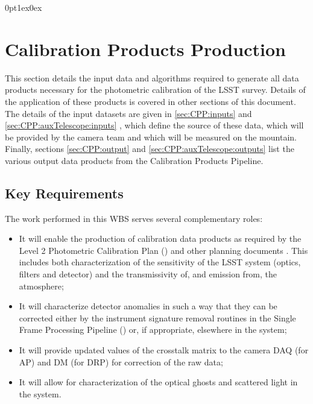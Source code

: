 \titlespacing*{\subsubsection}
{0pt}{1ex}{0ex}


\section{Calibration Products Production}
\label{sec:cpp}

This section details the input data and algorithms required to generate all data products necessary for the photometric calibration of the LSST survey. Details of the application of these products is covered in other sections of this document. The details of the input datasets are given in \secsymbol\ref{sec:CPP:inputs} and  \secsymbol\ref{sec:CPP:auxTelescope:inputs} , which define the source of these data, \ie which will be provided by the camera team and which will be measured on the mountain. Finally, sections \secsymbol\ref{sec:CPP:output} and \secsymbol\ref{sec:CPP:auxTelescope:outputs} list the various output data products from the Calibration Products Pipeline.

\subsection{Key Requirements}
\label{sec:CPP:keyRequirements}
The work performed in this WBS serves several complementary roles:

\begin{itemize}
 \item It will enable the production of calibration data products as required by the Level 2 Photometric Calibration Plan (\NewPCP{}) and other planning documents \cite{Lupton15}. This includes both characterization of the sensitivity of the LSST system (optics, filters and detector) and the transmissivity of, and emission from, the atmosphere;
 
 \item It will characterize detector anomalies in such a way that they can be corrected either by the instrument signature removal routines in the Single Frame Processing Pipeline (\wbsSFM) or, if appropriate, elsewhere in the system;
 
 \item It will provide updated values of the crosstalk matrix to the camera DAQ (for AP) and DM (for DRP) for correction of the raw data;
 
 \item It will allow for characterization of the optical ghosts and scattered light in the system.
\end{itemize}


